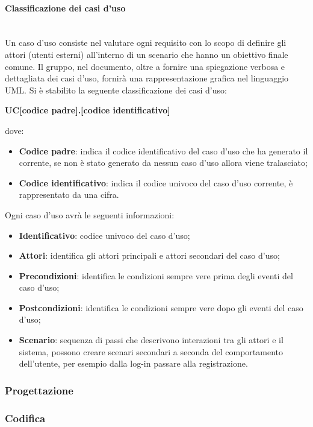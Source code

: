 \paragraph{Classificazione dei casi d'uso} \-\\
Un caso d'uso consiste nel valutare ogni requisito con lo scopo di definire gli attori (utenti esterni) all'interno di un scenario che hanno un obiettivo finale comune. Il gruppo, nel documento, oltre a fornire una spiegazione verbosa e dettagliata dei casi d'uso, fornirà una rappresentazione grafica nel linguaggio UML.
Si è stabilito la seguente classificazione dei casi d'uso:
\begin{center}
	\textbf{UC[codice padre].[codice identificativo]}
\end{center}
dove:
\begin{itemize}
	\item \textbf{Codice padre}: indica il codice identificativo del caso d'uso che ha generato il corrente, se non è stato generato da nessun caso d'uso allora viene tralasciato;
	\item \textbf{Codice identificativo}: indica il codice univoco del caso d'uso corrente, è rappresentato da una cifra.
\end{itemize}
Ogni caso d'uso avrà le seguenti informazioni:
\begin{itemize}
	\item \textbf{Identificativo}: codice univoco del caso d'uso;
	\item \textbf{Attori}: identifica gli attori principali e attori secondari del caso d'uso;
	\item \textbf{Precondizioni}: identifica le condizioni sempre vere prima degli eventi del caso d'uso;
	\item \textbf{Postcondizioni}: identifica le condizioni sempre vere dopo gli eventi del caso d'uso;
	\item \textbf{Scenario}: sequenza di passi che descrivono interazioni tra gli attori e il sistema, possono creare scenari secondari a seconda del comportamento dell'utente, per esempio dalla log-in passare alla registrazione.	
\end{itemize}

\subsubsection{Progettazione}\label{Progettazione}


\subsubsection{Codifica}
